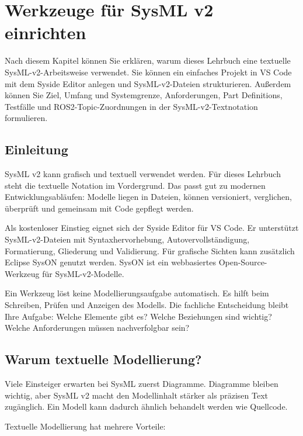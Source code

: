\chapter{Werkzeuge für SysML v2 einrichten}

\begin{lernziele}
Nach diesem Kapitel können Sie erklären, warum dieses Lehrbuch eine textuelle SysML-v2-Arbeitsweise verwendet. Sie können ein einfaches Projekt in VS Code mit dem Syside Editor anlegen und SysML-v2-Dateien strukturieren. Außerdem können Sie Ziel, Umfang und Systemgrenze, Anforderungen, Part Definitions, Testfälle und ROS2-Topic-Zuordnungen in der SysML-v2-Textnotation formulieren.
\end{lernziele}

\section{Einleitung}
SysML v2 kann grafisch und textuell verwendet werden. Für dieses Lehrbuch steht die textuelle Notation im Vordergrund. Das passt gut zu modernen Entwicklungsabläufen: Modelle liegen in Dateien, können versioniert, verglichen, überprüft und gemeinsam mit Code gepflegt werden.

Als kostenloser Einstieg eignet sich der Syside Editor für VS Code. Er unterstützt SysML-v2-Dateien mit Syntaxhervorhebung, Autovervollständigung, Formatierung, Gliederung und Validierung. Für grafische Sichten kann zusätzlich Eclipse SysON genutzt werden. SysON ist ein webbasiertes Open-Source-Werkzeug für SysML-v2-Modelle.

\begin{hinweisbox}
Ein Werkzeug löst keine Modellierungsaufgabe automatisch. Es hilft beim Schreiben, Prüfen und Anzeigen des Modells. Die fachliche Entscheidung bleibt Ihre Aufgabe: Welche Elemente gibt es? Welche Beziehungen sind wichtig? Welche Anforderungen müssen nachverfolgbar sein?
\end{hinweisbox}

\section{Warum textuelle Modellierung?}
Viele Einsteiger erwarten bei SysML zuerst Diagramme. Diagramme bleiben wichtig, aber SysML v2 macht den Modellinhalt stärker als präzisen Text zugänglich. Ein Modell kann dadurch ähnlich behandelt werden wie Quellcode.

Textuelle Modellierung hat mehrere Vorteile:

